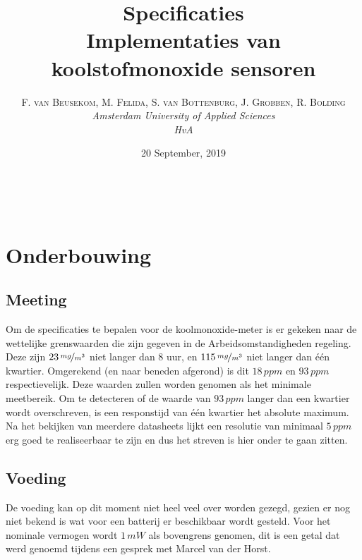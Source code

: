 \documentclass[a4paper, 11pt]{article} %
\title{\textbf{Specificaties}\\ %
Implementaties van koolstofmonoxide sensoren} %
\author{\textsc{F. van Beusekom, M. Felida, S. van Bottenburg, J. Grobben, R. Bolding} %
\\{\textit{Amsterdam University of Applied Sciences\\ 
HvA}}} %
\date{20 September, 2019} %
\makeatletter
\renewcommand{\maketitle}{ %
\begin{flushright} %
{\LARGE\@title} %

\vspace{50pt} %

{\large\@author} %
\\\@date %

\vspace{40pt} %
\end{flushright}
}
\makeatother
\begin{document}
\captionsetup{justification=centering}
\hypersetup{hidelinks=true}
\maketitle %




\vspace{10pt} %

\newpage
\section{Onderbouwing}
\subsection{Meeting}
Om de specificaties te bepalen voor de koolmonoxide-meter is er gekeken naar de wettelijke grenswaarden die zijn gegeven in de Arbeidsomstandigheden regeling. Deze zijn $23\,\nicefrac{mg}{m^{3}}$ niet langer dan 8 uur, en $115\,\nicefrac{mg}{m^{3}}$ niet langer dan één kwartier. Omgerekend (en naar beneden afgerond) is dit $18\,ppm$ en $93\,ppm$ respectievelijk. Deze waarden zullen worden genomen als het minimale meetbereik. Om te detecteren of de waarde van $93\,ppm$ langer dan een kwartier wordt overschreven, is een responstijd van één kwartier het absolute maximum. Na het bekijken van meerdere datasheets lijkt een resolutie van minimaal $5\,ppm$ erg goed te realiseerbaar te zijn en dus het streven is hier onder te gaan zitten.
\subsection{Voeding}
De voeding kan op dit moment niet heel veel over worden gezegd, gezien er nog niet bekend is wat voor een batterij er beschikbaar wordt gesteld. Voor het nominale vermogen wordt $1\,mW$ als bovengrens genomen, dit is een getal dat werd genoemd tijdens een gesprek met Marcel van der Horst.
\end{document}
